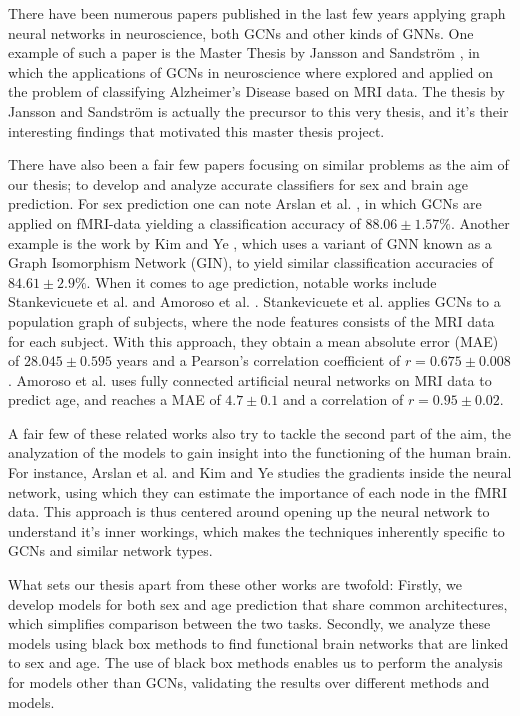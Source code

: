
There have been numerous papers published in the last few years applying graph neural networks in neuroscience, both GCNs and other kinds of GNNs. One example of such a paper is the Master Thesis by Jansson and Sandström \cite{jansson_sandstrom}, in which the applications of GCNs in neuroscience where explored and applied on the problem of classifying Alzheimer's Disease based on MRI data. The thesis by Jansson and Sandström is actually the precursor to this very thesis, and it's their interesting findings that motivated this master thesis project. 

There have also been a fair few papers focusing on similar problems as the aim of our thesis; to develop and analyze accurate classifiers for sex and brain age prediction. For sex prediction one can note Arslan et al. \cite{arslan}, in which GCNs are applied on fMRI-data yielding a classification accuracy of $88.06\pm1.57\%$. Another example is the work by Kim and Ye \cite{understanding_gnn}, which uses a variant of GNN known as a Graph Isomorphism Network (GIN), to yield similar classification accuracies of $84.61\pm2.9\%$. When it comes to age prediction, notable works include Stankevicuete et al. \cite{stankeviciute} and Amoroso et al. \cite{multiplex}. Stankevicuete et al. applies GCNs to a population graph of subjects, where the node features consists of the MRI data for each subject. With this approach, they obtain a mean absolute error (MAE) of $28.045\pm0.595$ years and a Pearson's correlation coefficient of $r=0.675\pm0.008$. Amoroso et al. uses fully connected artificial neural networks on MRI data to predict age, and reaches a MAE of $4.7\pm0.1$ and a correlation of $r=0.95\pm0.02$.

A fair few of these related works also try to tackle the second part of the aim, the analyzation of the models to gain insight into the functioning of the human brain. For instance, Arslan et al. and Kim and Ye studies the gradients inside the neural network, using which they can estimate the importance of each node in the fMRI data. This approach is thus centered around opening up the neural network to understand it's inner workings, which makes the techniques inherently specific to GCNs and similar network types. 

What sets our thesis apart from these other works are twofold: Firstly, we develop models for both sex and age prediction that share common architectures, which simplifies comparison between the two tasks. Secondly, we analyze these models using black box methods to find functional brain networks that are linked to sex and age. The use of black box methods enables us to perform the analysis for models other than GCNs, validating the results over different methods and models.

